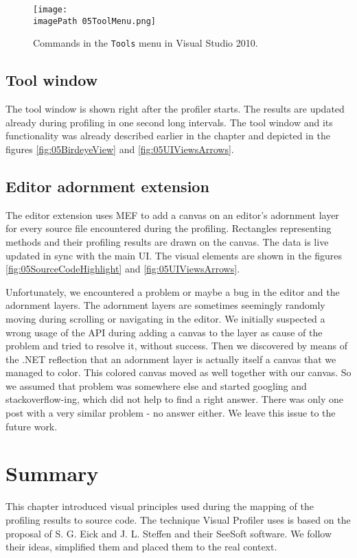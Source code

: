  \begin{figure}
	\centering
		\texttt{[image: \\imagePath 05ToolMenu.png]}
		\caption{Commands in the \texttt{Tools} menu in Visual Studio 2010. }
	\label{fig:05ToolMenu}
\end{figure}

\subsection{Tool window}
The tool window is shown right after the profiler starts. The results are updated already during profiling in one second long intervals. The tool window and its functionality was already described earlier in the chapter and depicted in the figures \ref{fig:05BirdeyeView} and \ref{fig:05UIViewsArrows}.

\subsection{Editor adornment extension}
\label{sec:06EditorAdorExt}
The editor extension uses MEF to add a canvas on an editor's adornment layer for every source file encountered during the profiling. Rectangles representing methods and their profiling results are drawn on the canvas. The data is live updated in sync with the main UI. The visual elements are shown in the figures \ref{fig:05SourceCodeHighlight} and \ref{fig:05UIViewsArrows}.

Unfortunately, we encountered a problem or maybe a bug in the editor and the adornment layers. The adornment layers are sometimes seemingly randomly moving during scrolling or navigating in the editor. We initially suspected a wrong usage of the API during adding a canvas to the layer as cause of the problem and tried to resolve it, without success. Then we discovered by means of the .NET reflection that an adornment layer is actually itself a canvas that we managed to color. This colored canvas moved as well together with our canvas. So we assumed that problem was somewhere else and started googling and stackoverflow-ing, which did not help to find a right answer. There was only one post with a very similar problem - no answer either. We leave this issue to the future work.

\section{Summary}
This chapter introduced visual principles used during the mapping of the profiling results to source code. The technique Visual Profiler uses is based on the proposal of S. G. Eick and J. L. Steffen and their SeeSoft software. We follow their ideas, simplified them and placed them to the real context.

